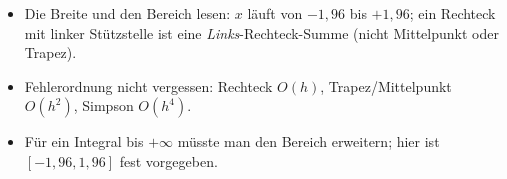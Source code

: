 \begin{achtung}
\begin{itemize}
  \item Die Breite und den Bereich lesen: $x$ läuft von $-1{,}96$ bis
        $+1{,}96$; ein Rechteck mit linker Stützstelle ist eine
        \emph{Links}-Rechteck-Summe (nicht Mittelpunkt oder Trapez).
  \item Fehlerordnung nicht vergessen: Rechteck $O(h)$, Trapez/Mittelpunkt
        $O(h^2)$, Simpson $O(h^4)$.
  \item Für ein Integral bis $+\infty$ müsste man den Bereich erweitern;
        hier ist $[-1{,}96,1{,}96]$ fest vorgegeben.
\end{itemize}
\end{achtung}
